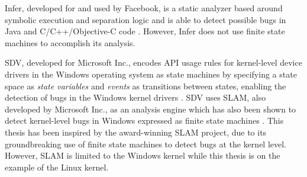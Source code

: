 \newpar Infer, developed for and used by Facebook, is a static analyzer based around symbolic execution and separation logic and is able to detect possible bugs in Java and C/C++/Objective-C code \cite{infer}. However, Infer does not use finite state machines to accomplish its analysis. 

\newpar SDV, developed for Microsoft Inc., encodes API usage rules for kernel-level device drivers in the Windows operating system as state machines by specifying a state space as \textit{state variables} and \textit{events} as transitions between states, enabling the detection of bugs in the Windows kernel drivers \cite{SDV}. SDV uses SLAM, also developed by Microsoft Inc., as an analysis engine which has also been shown to detect kernel-level bugs in Windows expressed as finite state machines \cite{SLAM}. This thesis has been inspired by the award-winning SLAM project, due to its groundbreaking use of finite state machines to detect bugs at the kernel level. However, SLAM is limited to the Windows kernel while this thesis is on the example of the Linux kernel. 